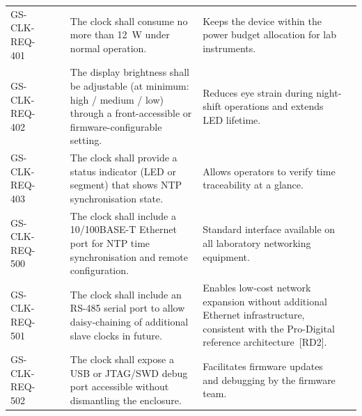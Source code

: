 \begin{landscape}
\begin{longtable}{C{3.5cm} C{2.4cm} C{1.7cm} L{8.5cm} L{5.7cm} C{2.5cm}}
    GS-CLK-REQ-401 &  & 
        & The clock shall consume no more than 12~W under normal operation.
        & Keeps the device within the power budget allocation for lab instruments.
        &  \\[2pt]

    GS-CLK-REQ-402 &  & 
        & The display brightness shall be adjustable (at minimum: high / medium / low) through a front-accessible or firmware-configurable setting.
        & Reduces eye strain during night-shift operations and extends LED lifetime.
        &  \\[2pt]

    GS-CLK-REQ-403 &  & 
        & The clock shall provide a status indicator (LED or segment) that shows NTP synchronisation state.
        & Allows operators to verify time traceability at a glance.
        &  \\[2pt]

    GS-CLK-REQ-500 &  & 
        & The clock shall include a 10/100BASE-T Ethernet port for NTP time synchronisation and remote configuration.
        & Standard interface available on all laboratory networking equipment.
        &  \\[2pt]

    GS-CLK-REQ-501 &  & 
        & The clock shall include an RS-485 serial port to allow daisy-chaining of additional slave clocks in future.
        & Enables low-cost network expansion without additional Ethernet infrastructure, consistent with the Pro-Digital reference architecture~[RD2].
        &  \\[2pt]

    GS-CLK-REQ-502 &  & 
        & The clock shall expose a USB or JTAG/SWD debug port accessible without dismantling the enclosure.
        & Facilitates firmware updates and debugging by the firmware team.
        &  \\[2pt]


\end{longtable}
\end{landscape}
